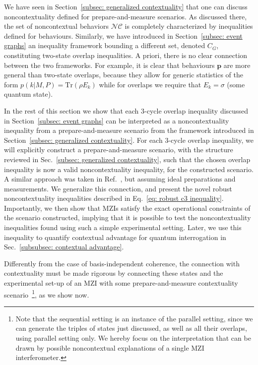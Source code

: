 \documentclass[letterpaper,onecolumn,12pt,accepted=2024-01-17]{article}
\begin{document}
{We have seen in Section~\ref{subsec: generalized contextuality} that one can discuss noncontextuality defined for prepare-and-measure scenarios. As discussed there, the set of noncontextual behaviors $\mathcal{NC}$ is completely characterized by inequalities defined for behaviours. Similarly, we have introduced in Section~\ref{subsec: event graphs} an inequality framework bounding a different set, denoted $C_G$, constituting two-state overlap inequalities. A priori, there is no clear connection between the two frameworks. %
For example, it is clear that behaviours $\mathbf{p}$ are more general than two-state overlaps, because they allow for generic statistics of the form $p(k|M,P) = \text{Tr}(\rho E_k)$ while for overlaps we require that $E_k = \sigma $ (some quantum state). }

{In the rest of this section we show that each $3$-cycle overlap inequality discussed in Section~\ref{subsec: event graphs} can be interpreted as a noncontextuality inequality from a prepare-and-measure scenario from the framework introduced in Section~\ref{subsec: generalized contextuality}. For each $3$-cycle overlap inequality, we will explicitly construct a prepare-and-measure scenario, with the structure reviewed in Sec.~\ref{subsec: generalized contextuality}, such that the chosen overlap inequality is now a valid noncontextuality inequality, for the constructed scenario. A similar approach was taken in Ref.~\cite{wagner2022inequalities}, but assuming ideal preparations and measurements. We generalize this connection, and present the  novel robust noncontextuality inequalities described in Eq.~\eqref{eq: robust c3 inequality}. Importantly, we then show that MZIs satisfy the exact operational constraints of the scenario constructed, implying that it is possible to test the noncontextuality inequalities found using such a simple experimental setting. Later, we use this inequality to quantify contextual advantage for quantum interrogation in Sec.~\ref{subsubsec: contextual advantage}. }

Differently from the case of basis-independent coherence, the connection with contextuality must be made rigorous by connecting these states and the experimental set-up of an MZI with some prepare-and-measure contextuality scenario~\footnote{Note that the sequential setting is an instance of  the parallel setting, since we can generate the triples of states just discussed, as well as all their overlaps, using parallel setting only. We hereby focus on the interpretation that can be drawn by possible noncontextual explanations of a single MZI interferometer.}, as we show now. 
\end{document}
